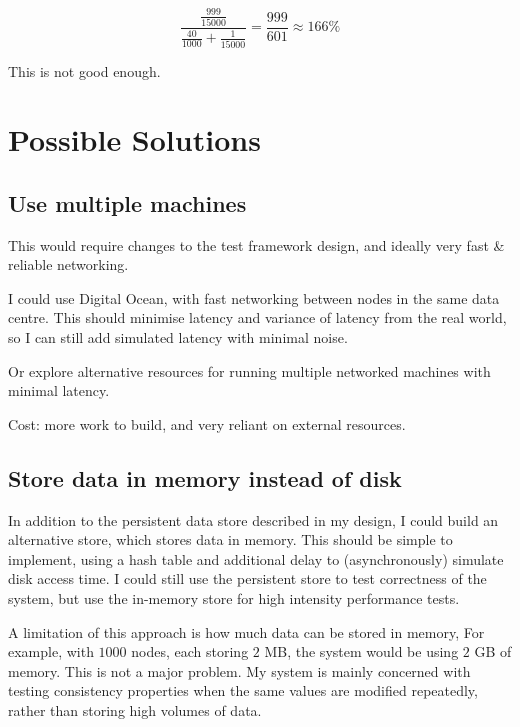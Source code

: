 \documentclass[12pt,a4paper]{article}
\begin{document}
$$\frac{\frac{999}{15000}}{\frac{40}{1000} + \frac{1}{15000}} = \frac{999}{601} \approx 166\%$$

This is not good enough.

\section*{Possible Solutions}

\subsection{Use multiple machines}

This would require changes to the test framework design, and ideally very fast \& reliable networking.

I could use Digital Ocean, with fast networking between nodes in the same data centre. This should minimise latency and variance of latency from the real world, so I can still add simulated latency with minimal noise.

Or explore alternative resources for running multiple networked machines with minimal latency.

Cost: more work to build, and very reliant on external resources.

\subsection{Store data in memory instead of disk}

In addition to the persistent data store described in my design, I could build an alternative store, which stores data in memory. This should be simple to implement, using a hash table and additional delay to (asynchronously) simulate disk access time. I could still use the persistent store to test correctness of the system, but use the in-memory store for high intensity performance tests.

A limitation of this approach is how much data can be stored in memory, For example, with $1000$ nodes, each storing $2$ MB, the system would be using $2$ GB of memory. This is not a major problem. My system is mainly concerned with testing consistency properties when the same values are modified repeatedly, rather than storing high volumes of data.
\end{document}
